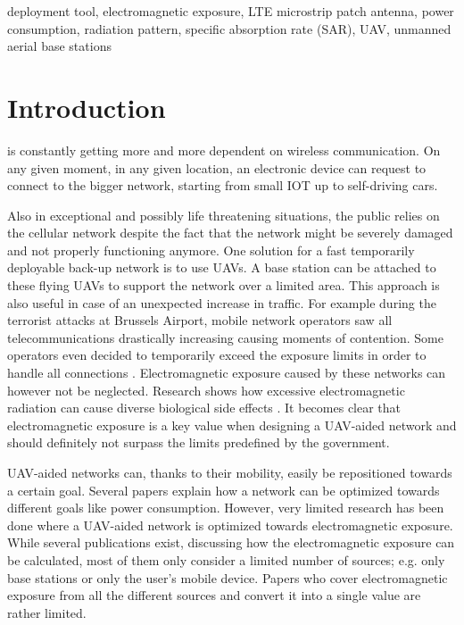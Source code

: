 \documentclass[twocolumn]{phdsymp} %
\begin{document}
\begin{keywords}
deployment tool,  electromagnetic exposure, LTE
microstrip patch antenna, power consumption,
radiation pattern, specific absorption rate (SAR),
UAV, unmanned aerial base stations
\end{keywords}

\section{Introduction}
 is constantly getting more and more dependent on wireless communication. 
On any given moment, in any given location, an electronic device
can request to connect to the bigger network, 
starting from small \gls{IOT} up to self-driving cars.

Also in exceptional and possibly life threatening situations, the public relies on the cellular network
despite the fact that the network might be severely damaged and not properly functioning anymore.
One solution for a fast temporarily deployable back-up network is to use \gls{UAV}s. A base station can be attached to 
these flying \gls{UAV}s to support the network over a limited area. 
This approach is also useful in case of an unexpected increase in traffic. 
For example during the terrorist attacks at Brussels Airport,
mobile network operators saw all telecommunications drastically increasing causing moments of contention. 
Some operators even decided to temporarily exceed the exposure limits in
order to handle all connections \cite{baseZaventem}.
Electromagnetic exposure caused by these networks can however not be neglected. 
Research shows how excessive electromagnetic radiation can cause diverse biological side effects \cite{J31_bioeffects,WHO}.
It becomes clear that electromagnetic exposure is a key value when designing a \gls{UAV}-aided network and should definitely 
not surpass the limits predefined by the government.

\gls{UAV}-aided networks can, thanks to their mobility, easily be repositioned towards a certain goal. Several papers 
explain how a network can be optimized towards different goals like power consumption.
However, very limited
research has been done where a \gls{UAV}-aided network is optimized towards electromagnetic exposure.
While several publications exist, discussing how the electromagnetic exposure can be calculated, 
most of them only consider a limited number of sources; e.g. only base stations or only the user's mobile device.
Papers who cover electromagnetic exposure from all the different sources and convert it into a single value are rather limited.
\end{document}
